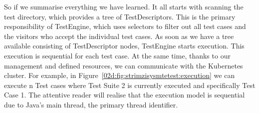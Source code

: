 So if we summarise everything we have learned.
It all starts with scanning the test directory, which provides a tree of TestDescriptors.
This is the primary responsibility of TestEngine, which uses selectors to filter out all test cases and the visitors who accept the individual test cases.
As soon as we have a tree available consisting of TestDescriptor nodes, TestEngine starts execution.
This execution is sequential for each test case.
At the same time, thanks to our management and defined resources, we can communicate with the Kubernetes cluster.
For example, in Figure~\ref{02d:fig:strimzisysmtetest:execution} we can execute n Test cases where Test Suite 2 is currently executed and specifically Test Case 1.
The attentive reader will realise that the execution model is sequential due to Java's main thread, the primary thread identifier.